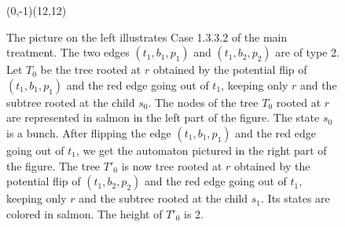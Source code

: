 \documentclass[11pt,a4paper]{article}
\def\T{{T}}
\begin{document}
\begin{itemize}
\begin{figure}[htbp]
{\begin{VCPicture}{(0,-1)(12,12)}
{
\RstStateFillColor 
{}
}
\end{VCPicture}}
        \caption{ The picture on the left illustrates Case 1.3.3.2 of
          the main treatment. The two edges $(t_1,b_1,p_1)$ and
          $(t_1,b_2,p_2)$ are of type 2.  Let $\T_0$ be the tree
          rooted at $r$ obtained by the potential flip of
          $(t_1,b_1,p_1)$ and the red edge going out of $t_1$, keeping
          only $r$ and the subtree rooted at the child $s_0$. The
          nodes of the tree $\T_0$ rooted at $r$ are represented in
          salmon in the left part of the figure. The state $s_0$ is a
          bunch. After flipping the edge $(t_1,b_1,p_1)$ and the red
          edge going out of $t_1$, we get the automaton pictured in
          the right part of the figure.  The tree $\T'_0$ is now tree
          rooted at $r$ obtained by the potential flip of
          $(t_1,b_2,p_2)$ and the red edge going out of $t_1$, keeping
          only $r$ and the subtree rooted at the child $s_1$. Its
          states are colored in salmon. The height of $T'_0$ is 2.}
\label{figure.cluster4}
\end{figure}





\end{itemize}
\end{document}
